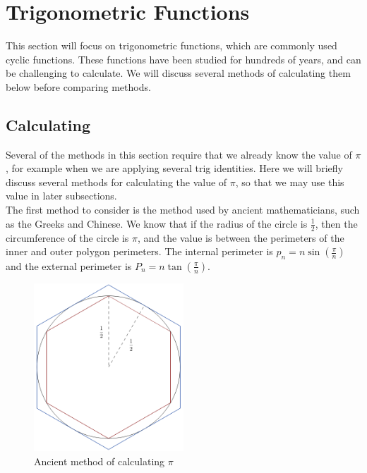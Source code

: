 \section{Trigonometric Functions}

This section will focus on trigonometric functions, which are commonly used cyclic functions. These functions have been studied for hundreds of years, and can be challenging to calculate. We will discuss several methods of calculating them below before comparing methods.


\subsection{Calculating \pi}
\label{SUB_"Calculating pi"}

Several of the methods in this section require that we already know the value of \(\pi\), for example when we are applying several trig identities. Here we will briefly discuss several methods for calculating the value of \(\pi\), so that we may use this value in later subsections.\\

The first method to consider is the method used by ancient mathematicians, such as the Greeks and Chinese. We know that if the radius of the circle is \(\frac{1}{2}\), then the circumference of the circle is \(\pi\), and the value is between the perimeters of the inner and outer polygon perimeters. The internal perimeter is \(p_n = n\sin(\frac{\pi}{n})\) and the external perimeter is \(P_n = n\tan(\frac{\pi}{n})\).

\begin{figure}[!ht]
	\label{FIG_"Pi Diagram 1"}
	\caption{Ancient method of calculating \(\pi\)}
	\centering
	\includegraphics[width=0.5\textwidth]{"./Diagrams/Pi Diagram 1"}
\end{figure}

